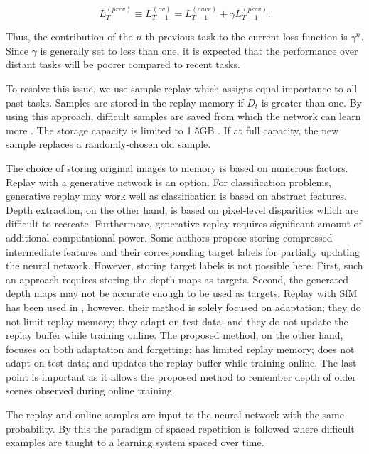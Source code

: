 \documentclass[lettersize,journal]{IEEEtran}
\begin{document}
 \begin{equation}
    L_T^{(prev)} \equiv L_{T-1}^{(ov)} = L_{T-1}^{(curr)} + \gamma L_{T-1}^{(prev)}.
 \end{equation}
 
 \noindent Thus, the contribution of the $n$-th previous task to the current loss function is $\gamma^n$. Since $\gamma$ is generally set to less than one, it is expected that the performance over distant tasks will be poorer compared to recent tasks.
 
 To resolve this issue, we use sample replay which assigns equal importance to all past tasks. Samples are stored in the replay memory if $D_t$ is greater than one. By using this approach, difficult samples are saved from which the network can learn more \cite{chrysakis2020online}. The storage capacity is limited to 1.5GB \cite{hayes2020remind}. If at full capacity, the new sample replaces a randomly-chosen old sample. 
 
 The choice of storing original images to memory is based on numerous factors. Replay with a generative network \cite{shin2017continual} is an option. For classification problems, generative replay may work well as classification is based on abstract features. Depth extraction, on the other hand, is based on pixel-level disparities which are difficult to recreate. Furthermore, generative replay requires significant amount of additional computational power. Some authors \cite{hayes2020remind} propose storing compressed intermediate features and their corresponding target labels for partially updating the neural network. However, storing target labels is not possible here. First, such an approach requires storing the depth maps as targets. Second, the generated depth maps may not be accurate enough to be used as targets. Replay with SfM has been used in \cite{kuznietsov2021comoda}, however, their method is solely focused on adaptation; they do not limit replay memory; they adapt on test data; and they do not update the replay buffer while training online. The proposed method, on the other hand, focuses on both adaptation and forgetting; has limited replay memory; does not adapt on test data; and updates the replay buffer while training online. The last point is important as it allows the proposed method to remember depth of older scenes observed during online training. 
 
 The replay and online samples are input to the neural network with the same probability. By this the paradigm of spaced repetition \cite{amiri2017repeat} is followed where difficult examples are taught to a learning system spaced over time. 
 
\end{document}
